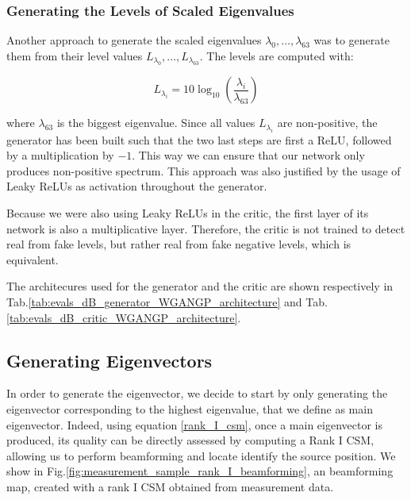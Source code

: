 \documentclass[11pt,a4paper,twoside]{report}
\begin{document}
\subsubsection{Generating the Levels of Scaled Eigenvalues}

Another approach to generate the scaled eigenvalues $\lambda_0, \dots, \lambda_{63}$ was to generate them from their level values $ L_{\lambda_0} , \dots,  L_{\lambda_{63}} $. The levels are computed with:

\begin{equation}
    L_{\lambda_i} = 10 \log_{10}(\frac{\lambda_i}{\lambda_{63}})
\end{equation}

where $\lambda_{63}$ is the biggest eigenvalue.  Since all values $L_{\lambda_i}$ are non-positive, the generator has been built such that the two last steps are first a ReLU, followed by a multiplication by $-1$. This way we can ensure that our network only produces non-positive spectrum. This approach was also justified by the usage of Leaky ReLUs as activation throughout the generator. 

Because we were also using Leaky ReLUs in the critic, the first layer of its network is  also a multiplicative layer. Therefore, the critic is not trained to detect real from fake levels, but rather real from fake negative levels, which is equivalent. 

The architecures used for the generator and the critic are shown respectively in Tab.\ref{tab:evals_dB_generator_WGANGP_architecture} and Tab.\ref{tab:evals_dB_critic_WGANGP_architecture}.


\subsection{Generating Eigenvectors}

In order to generate the eigenvector, we decide to start by only generating the eigenvector corresponding to the highest eigenvalue, that we define as main eigenvector. Indeed, using equation \ref{rank_I_csm}, once a main eigenvector is produced, its quality can be directly assessed by computing a Rank I CSM, allowing us to perform beamforming and locate identify the source position. We show in Fig.\ref{fig:measurement_sample_rank_I_beamforming}, an beamforming map, created with a rank I CSM obtained from measurement data.
\end{document}
